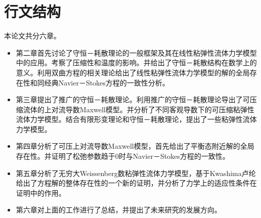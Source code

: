 \documentclass{article}
\begin{document}
\section{行文结构}
本论文共分六章。
\begin{itemize}
\item 第二章首先讨论了守恒－耗散理论的一般框架及其在线性粘弹性流体力学模型中的应用。考察了压缩性和温度的影响。并给出了守恒－耗散结构在数学上的意义。利用双曲方程的相关理论给出了线性粘弹性流体力学模型的解的全局存在性和同经典Navier－Stokes方程的一致性分析。
\item 第三章提出了推广的守恒－耗散理论。利用推广的守恒－耗散理论导出了可压缩流体的上对流导数Maxwell模型。并分析了不同客观导数下的可压缩粘弹性流体力学模型。结合有限形变理论和守恒－耗散理论，提出了一些粘弹性流体力学模型。
\item 第四章分析了可压上对流导数Maxwell模型，首先给出了平衡态附近解的全局存在性。并证明了松弛参数趋于0时与Navier－Stokes方程的一致性。
\item 第五章分析了无穷大Weissenberg数粘弹性流体力学模型，基于Kwashima卢纶给出了方程解的整体存在性的一个新的证明，并分析了力学上的适应性条件在证明中的作用。
\item 第六章对上面的工作进行了总结，并提出了未来研究的发展方向。
\end{itemize}





	
	

 
\end{document}
